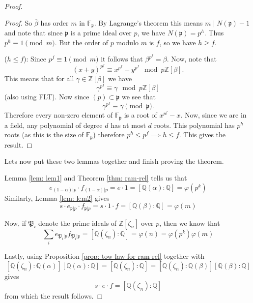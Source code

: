 \documentclass[11pt,a4paper]{report}
\theoremstyle{plain}
\theoremstyle{definition}
\theoremstyle{definition}
\newcommand{\ZZ}{\mathbb{Z}}
\def\FF{\mathbb{F}}
\def\QQ{\mathbb{Q}}
\def \gothP{\mathfrak{P}}
\def\gothp{\mathfrak{p}}
\def \a{\alpha}
\def \ov{\overline}
\begin{document}
\begin{proof}
\begin{proof}
			So $\ov{\beta}$ has order $m$ in $\FF_{\gothp}$. By Lagrange's theorem this means $m\mid N(\gothp)-1$ and note that since $\gothp$ is a prime ideal over $p$, we have $N(\gothp)=p^h$. Thus $p^h \equiv 1 \pmod m$. But the order of $p$ modulo $m$ is $f$, so we have $h \geq f$.
			
			
			($h \leq f$): Since $p^f \equiv 1 \pmod m$ it follows that $\beta^{p^f} = \beta$. Now, note that \[(x+y)^{p^f} \equiv x^{p^f}+y^{p^f} \mod p\ZZ[\beta].\] This means that for all $\gamma \in \ZZ[\beta]$ we have \[\gamma^{p^f} \equiv \gamma \mod p\ZZ[\beta]\] (also using FLT). Now since $(p) \subset \gothp$ we see that \[\gamma^{p^f} \equiv \gamma \pmod \gothp.\] Therefore every non-zero element of $\FF_{\gothp}$ is a root of $x^{p^f}-x$. Now, since we are in a field, any polynomial of degree $d$ has at most $d$ roots. This polynomial has $p^h$ roots (as this is the size of $\FF_{\gothp}$) therefore $p^h \leq p^f \implies h \leq f$. This gives the result.
			
			
			
		\end{proof}
		
		
		Lets now put these two lemmas together and finish proving the theorem. 
		
		Lemma \ref{lem: lem1} and Theorem \ref{thm: ram-rel} tells us that \[e_{(1-\a)|p} \cdot f_{(1-\a)|p}=e \cdot 1=[\QQ(\a):\QQ]=\varphi(p^k)\]
		Similarly, Lemma \ref{lem: lem2} gives \[s \cdot e_{\gothp|p}\cdot f_{\gothp|p}=s \cdot 1\cdot f=[\QQ(\beta):\QQ]=\varphi(m)\]
		
		Now, if $\gothP_i$ denote the prime ideals of $\ZZ[\zeta_n]$ over $p$, then we know that  \[\sum_i e_{\gothP_i|p}f_{\gothP_i|p}=[\QQ(\zeta_n):\QQ]=\varphi(n)=\varphi(p^k)\varphi(m)\]
		
		Lastly, using Proposition \ref{prop: tow law for ram rel} together with \[[\QQ(\zeta_n):\QQ(\a)][\QQ(\a):\QQ]=[\QQ(\zeta_n):\QQ]=[\QQ(\zeta_n):\QQ(\beta)][\QQ(\beta):\QQ]\] gives \[s \cdot e \cdot f=[\QQ(\zeta_n):\QQ]\] from which the result follows.
		
		
	\end{proof}
	
\end{document}
